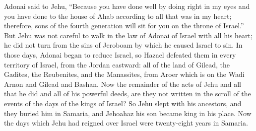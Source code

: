 \begin{biblechapter}
\verse Adonai said to Jehu, “Because you have done well by doing right in my eyes and you have done to the house of Ahab according to all that was in my heart; therefore, sons of the fourth generation will sit for you on the throne of Israel.”
\verse But Jehu was not careful to walk in the law of Adonai of Israel with all his heart; he did not turn from the sins of Jeroboam by which he caused Israel to sin.
\verse In those days, Adonai began to reduce Israel, so Hazael defeated them in every territory of Israel,
\verse from the Jordan eastward: all of the land of Gilead, the Gadites, the Reubenites, and the Manassites, from Aroer which is on the Wadi Arnon and Gilead and Bashan.
\verse Now the remainder of the acts of Jehu and all that he did and all of his powerful deeds, are they not written in the scroll of the events of the days of the kings of Israel?
\verse So Jehu slept with his ancestors, and they buried him in Samaria, and Jehoahaz his son became king in his place.
\verse Now the days which Jehu had reigned over Israel were twenty-eight years in Samaria.
\end{biblechapter}


